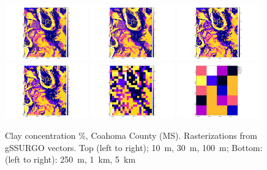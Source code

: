 \documentclass[soil, manuscript]{copernicus}
\begin{document}
\begin{figure}
 \includegraphics[width=0.32\textwidth]{ggsurgo-to-raster-10m.png}
  \hfill
  \includegraphics[width=0.32\textwidth]{ggsurgo-to-raster-30m.png}
  \hfill
  \includegraphics[width=0.32\textwidth]{ggsurgo-to-raster-100m.png}  
  \\
  \includegraphics[width=0.32\textwidth]{ggsurgo-to-raster-250m.png}
  \hfill
  \includegraphics[width=0.32\textwidth]{ggsurgo-to-raster-1km.png}
  \hfill
  \includegraphics[width=0.32\textwidth]{ggsurgo-to-raster-5km.png}
 \caption{Clay concentration \%, Coahoma County (MS). Rasterizations from gSSURGO vectors. Top (left to right); 10~m, 30~m, 100~m; Bottom: (left to right): 250~m, 1~km, 5~km}
  \label{fig:coahoma_clay}
\end{figure}
\end{document}
